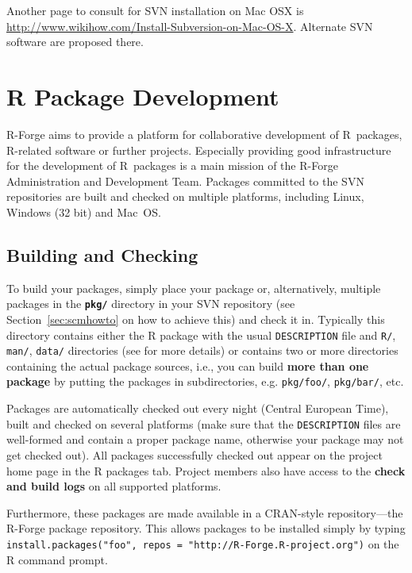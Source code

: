 \documentclass[a4paper]{article}
\newcommand{\RFORGE}{\proglang{R}-Forge Administration and Development Team}
\newcommand{\proglang}[1]{\textsf{#1}}
\begin{document}
Another page to consult for SVN installation on Mac OSX is
\url{http://www.wikihow.com/Install-Subversion-on-Mac-OS-X}. Alternate SVN
software are proposed there. 

\section{\proglang{R} Package Development}

\proglang{R}-Forge aims to provide a platform for collaborative development of
\proglang{R}~packages, \proglang{R}-related software or further
projects. Especially providing good infrastructure for the development of
\proglang{R}~packages is a main mission of the \RFORGE{}. Packages
committed to the SVN repositories are built and checked on multiple
platforms, including Linux, Windows (32 bit) and Mac~OS. 

\subsection{Building and Checking}
To build your packages, simply place your package or, alternatively,
multiple packages in the
\textbf{\texttt{pkg/}} directory in your SVN repository (see 
Section~\ref{sec:scmhowto} on how to achieve this) and check it
in. Typically this directory contains either the R package with the usual
\texttt{DESCRIPTION} file and \texttt{R/}, \texttt{man/},
\texttt{data/} directories (see \cite{Rcore:writing_R_extensions} for more
details) or contains two or more directories containing the actual
package sources, i.e., you can build \textbf{more than one package} by
putting the packages in subdirectories, e.g. \texttt{pkg/foo/}, 
\texttt{pkg/bar/}, etc.

Packages are automatically checked out every night (Central European
Time), built and checked on several platforms (make sure that the
\texttt{DESCRIPTION} files are well-formed and contain a proper 
package name, otherwise your package may not get checked out). All
packages successfully checked out appear on the project home page in
the \proglang{R} packages tab. Project members also have access to the
\textbf{check and build logs} on all supported platforms.  

Furthermore, these packages are made available in a CRAN-style
repository---the
\proglang{R}-Forge package repository. This allows packages to be installed simply by
typing \texttt{install.packages("foo", repos = "http://R-Forge.R-project.org")}
on the \proglang{R} command prompt. 
\end{document}

